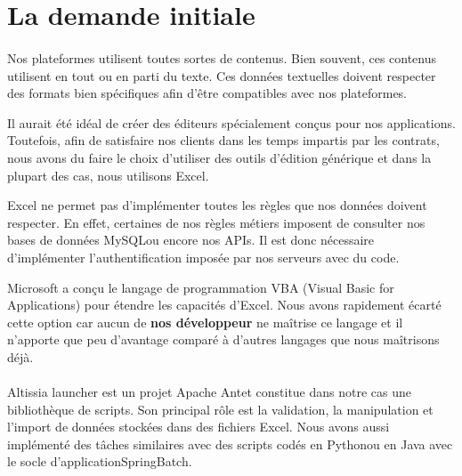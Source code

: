 \section{La demande initiale}
\label{sec:initial-request}

\paragraph{}
Nos plateformes utilisent toutes sortes de contenus.
Bien souvent, ces contenus utilisent en tout ou en parti du texte.
Ces données textuelles doivent respecter des formats bien spécifiques afin d'être compatibles avec nos plateformes.

Il aurait été idéal de créer des éditeurs spécialement conçus pour nos applications.
Toutefois, afin de satisfaire nos clients dans les temps impartis par les contrats, nous avons du faire le choix d'utiliser des outils d'édition générique et dans la plupart des cas, nous utilisons Excel.

Excel ne permet pas d'implémenter toutes les règles que nos données doivent respecter.
En effet, certaines de nos règles métiers imposent de consulter nos bases de données MySQL\fnmark ou encore nos APIs\fnmark.
Il est donc nécessaire d'implémenter l'authentification imposée par nos serveurs avec du code.

Microsoft a conçu le langage de programmation VBA (Visual Basic for Applications) pour étendre les capacités d'Excel\cite{o365devx_pris_nodate}.
Nous avons rapidement écarté cette option car aucun de \textbf{nos développeur} ne maîtrise ce langage et il n'apporte que peu d'avantage comparé à d'autres langages que nous maîtrisons déjà.


\paragraph{}
Altissia launcher est un projet Apache Ant\fnmark et constitue dans notre cas une bibliothèque de scripts.
Son principal rôle est la validation, la manipulation et l'import de données stockées dans des fichiers Excel.
Nous avons aussi implémenté des tâches similaires avec des scripts codés en Python\fnmark ou en Java avec le socle d'application\fnmark Spring\fnmark Batch\fnmark.

